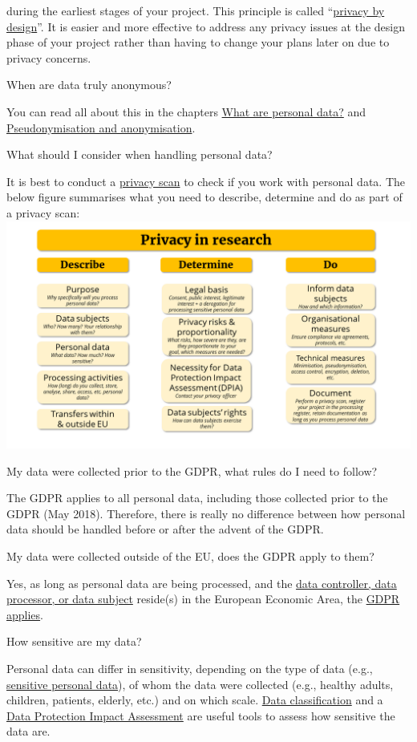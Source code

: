 \documentclass[
]{book}
\begin{document}
during the earliest stages of your project. This principle is called ``\protect\hyperlink{privacy-by-design}{privacy by design}''. It is easier and more effective to address any privacy issues at the design phase of your project rather than having to change your plans later on due to privacy concerns.

When are data truly anonymous?

You can read all about this in the chapters \protect\hyperlink{personal-data}{What are personal data?} and \protect\hyperlink{pseudonymisation-anonymisation}{Pseudonymisation and anonymisation}.

What should I consider when handling personal data?

It is best to conduct a \protect\hyperlink{privacy-scan}{privacy scan} to check if you work with personal data. The below figure summarises what you need to describe, determine and do as part of a privacy scan: \includegraphics{img/privacyscan_infograph.png}

My data were collected prior to the GDPR, what rules do I need to follow?

The GDPR applies to all personal data, including those collected prior to the GDPR (May 2018). Therefore, there is really no difference between how personal data should be handled before or after the advent of the GDPR.

My data were collected outside of the EU, does the GDPR apply to them?

Yes, as long as personal data are being processed, and the \protect\hyperlink{definitions}{data controller, data processor, or data subject} reside(s) in the European Economic Area, the \protect\hyperlink{gdpr-scope}{GDPR applies}.~

How sensitive are my data?

Personal data can differ in sensitivity, depending on the type of data (e.g., \protect\hyperlink{special-types-personal-data}{sensitive personal data}), of whom the data were collected (e.g., healthy adults, children, patients, elderly, etc.) and on which scale. \protect\hyperlink{data-classification}{Data classification} and a \protect\hyperlink{dpia}{Data Protection Impact Assessment} are useful tools to assess how sensitive the data are.
\end{document}
